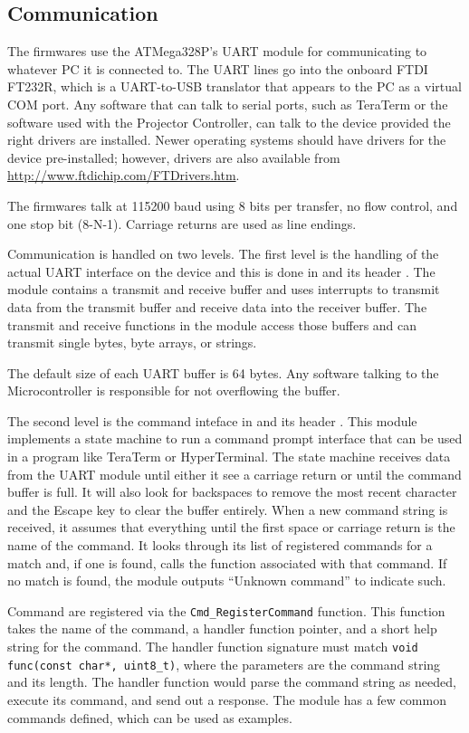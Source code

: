 \documentclass{article}
\begin{document}
\subsection{Communication} \label{ssec:FWComm}
The firmwares use the ATMega328P's UART module for communicating to whatever PC it is connected to.
The UART lines go into the onboard FTDI FT232R, which is a UART-to-USB translator that appears to
the PC as a virtual COM port.  Any software that can talk to serial ports, such as TeraTerm or the
software used with the Projector Controller, can talk to the device provided the right drivers are
installed.  Newer operating systems should have drivers for the device pre-installed; however,
drivers are also available from \url{http://www.ftdichip.com/FTDrivers.htm}.

The firmwares talk at 115200 baud using 8 bits per transfer, no flow control, and one stop bit
(8-N-1).  Carriage returns are used as line endings.

Communication is handled on two levels.  The first level is the handling of the actual UART
interface on the device and this is done in  and its header
.  The module contains a transmit and receive buffer and uses interrupts to transmit
data from the transmit buffer and receive data into the receiver buffer.  The transmit and receive
functions in the module access those buffers and can transmit single bytes, byte arrays, or strings.

The default size of each UART buffer is 64 bytes.  Any software talking to the Microcontroller is
responsible for not overflowing the buffer.

The second level is the command inteface in  and its header
. This module implements a state machine to run a command prompt interface that can be
used in a program like TeraTerm or HyperTerminal.  The state machine receives data from the UART
module until either it see a carriage return or until the command buffer is full.  It will also look
for backspaces to remove the most recent character and the Escape key to clear the buffer entirely.
When a new command string is received, it assumes that everything until the first space or carriage
return is the name of the command.  It looks through its list of registered commands for a match
and, if one is found, calls the function associated with that command.  If no match is found, the
module outputs ``Unknown command'' to indicate such.

Command are registered via the \texttt{Cmd\_RegisterCommand} function.  This function takes the name
of the command, a handler function pointer, and a short help string for the command.  The handler
function signature must match \texttt{void func(const char*, uint8\_t)}, where the parameters are the
command string and its length.  The handler function would parse the command string as needed,
execute its command, and send out a response.  The module has a few common commands defined, which
can be used as examples.
\end{document}

